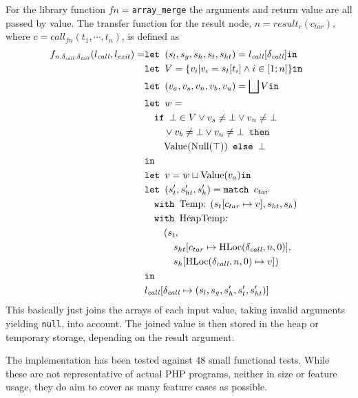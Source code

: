For the library function $fn = $\texttt{array\_merge}  the arguments and return value are all passed by value. The transfer function for the result node, $n = \mathit{result}_{c}(c_{\mathit{tar}})$, where $c = \mathit{call}_{{fn}}(t_1,\cdots, t_n)$, is defined as 
\begin{align*}
f_{n,\delta_{\mathit{call}},\delta_{\mathit{exit}}}(l_{\mathit{call}}, l_{\mathit{exit}}) = 	&\texttt{let } (s_l, s_g, s_h, s_t, s_{ht}) = l_{\mathit{call}}[\delta_{\mathit{call}}] \texttt{in }\notag\\
																							&\texttt{let } V =  \{v_i| v_i = s_t[t_i]\wedge i \in [1;n]\} \texttt{in }\notag\\
																							&\texttt{let } (v_a,v_s, v_n, v_b, v_u) = \bigsqcup V \texttt{in }\notag\\
																							&\texttt{let } w =  \notag\\
																							&\quad\texttt{if }\bot \in V \vee v_s \neq \bot \vee v_n \neq \bot\notag\\
																							&\quad\quad \vee v_b \neq \bot \vee v_u \neq \bot\texttt{ then } \notag\\
																							&\quad\quad\text{Value}(\text{Null}(\top)) \texttt{ else } \bot\notag\\
																							& \texttt{in }\notag\\
																							&\texttt{let } v = w \sqcup \text{Value}(v_a) \texttt{in }\notag\\
																							&\texttt{let } (s_t', s_{ht}',s_h') = \texttt{match }c_{tar}\notag\\
																							&\quad\texttt{with }\text{Temp}\text{: } (s_t[c_{tar}\mapsto v], s_{ht}, s_h)\notag\\
																							&\quad\texttt{with }\text{HeapTemp}\text{: }\notag\\
																							&\quad\quad(s_t, \notag\\
																							&\quad\quad\quad s_{ht}[c_{tar}\mapsto \text{HLoc}(\delta_{\mathit{call}}, n, 0)], \notag\\
																							&\quad\quad\quad s_h[\text{HLoc}(\delta_{\mathit{call}}, n, 0)\mapsto v])\notag\\
																							& \texttt{in }\notag\\
																							&l_{\mathit{call}}[\delta_{\mathit{call}}\mapsto (s_l, s_g, s_h', s_t', s_{ht}')]
\end{align*} 
This basically just joins the arrays of each input value, taking invalid arguments yielding \texttt{null}, into account. The joined value is then stored in the heap or temporary storage, depending on the result argument.

The implementation has been tested against 48 small functional tests. While these are not representative of actual PHP programs, neither in size or feature usage, they do aim to cover as many feature cases as possible.


